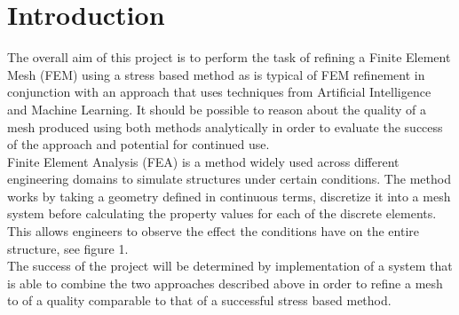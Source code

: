 \section{Introduction}

The overall aim of this project is to perform the task of refining a Finite Element Mesh (FEM) using a stress based method as is typical of FEM refinement in conjunction with an approach that uses techniques from Artificial Intelligence and Machine Learning. It should be possible to reason about the quality of a mesh produced using both methods analytically in order to evaluate the success of the approach and potential for continued use.\\

\noindent
Finite Element Analysis (FEA) is a method widely used across different engineering domains to simulate structures under certain conditions. The method works by taking a geometry defined in continuous terms, discretize it into a mesh system before calculating the property values for each of the discrete elements. This allows engineers to observe the effect the conditions have on the entire structure, see figure 1. \\ 

\noindent
The success of the project will be determined by implementation of a system that is able to combine the two approaches described above in order to refine a mesh to of a quality comparable to that of a successful stress based method.

